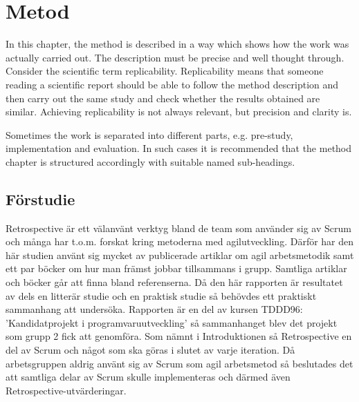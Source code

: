 
\chapter{Metod}
\label{cha:method}

In this chapter, the method is described in a way which shows how the
work was actually carried out. The description must be precise and
well thought through. Consider the scientific term
replicability. Replicability means that someone reading a scientific
report should be able to follow the method description and then carry
out the same study and check whether the results obtained are
similar. Achieving replicability is not always relevant, but precision
and clarity is.

Sometimes the work is separated into different parts, e.g.  pre-study,
implementation and evaluation. In such cases it is recommended that
the method chapter is structured accordingly with suitable named
sub-headings.

\section{Förstudie}
\label{sec:pre-study}

Retrospective är ett välanvänt verktyg bland de team som använder sig av Scrum och många har t.o.m. forskat
kring metoderna med agilutveckling. Därför har den här studien använt sig mycket av publicerade artiklar om agil arbetsmetodik
samt ett par böcker om hur man främst jobbar tillsammans i grupp. Samtliga artiklar och böcker går att finna bland referenserna.
Då den här rapporten är resultatet av dels en litterär studie och en praktisk studie så behövdes ett praktiskt sammanhang att undersöka.
Rapporten är en del av kursen TDDD96: 'Kandidatprojekt i programvaruutveckling' så sammanhanget blev det projekt som grupp 2 fick att genomföra.
Som nämnt i Introduktionen så Retrospective en del av Scrum och något som ska göras i slutet av varje iteration.
Då arbetsgruppen aldrig använt sig av Scrum som agil arbetsmetod så beslutades det att samtliga delar av Scrum skulle implementeras och därmed
även Retrospective-utvärderingar.

